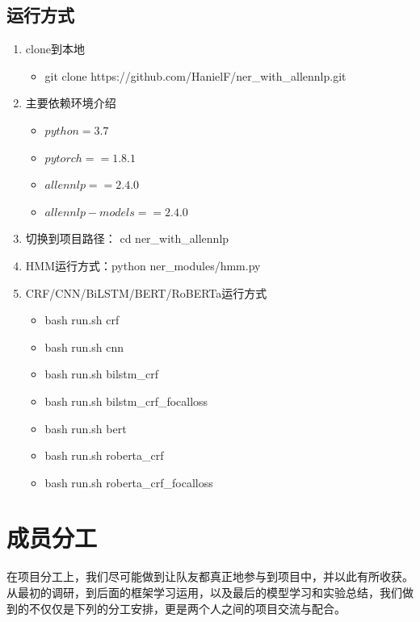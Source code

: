 \documentclass[a4paper, 12pt]{article}
\begin{document}
\subsection{运行方式}

\begin{enumerate}
    \item clone到本地
        \begin{itemize}
            \item git clone https://github.com/HanielF/ner\_with\_allennlp.git
        \end{itemize}
    \item 主要依赖环境介绍
        \begin{itemize}
            \item $python= 3.7$
            \item $pytorch== 1.8.1$
            \item $allennlp== 2.4.0$
            \item $allennlp-models==2.4.0$
        \end{itemize}
    \item 切换到项目路径： cd ner\_with\_allennlp
    \item HMM运行方式：python ner\_modules/hmm.py
    \item CRF/CNN/BiLSTM/BERT/RoBERTa运行方式
        \begin{itemize}
            \item bash run.sh crf
            \item bash run.sh cnn
            \item bash run.sh bilstm\_crf
            \item bash run.sh bilstm\_crf\_focalloss
            \item bash run.sh bert
            \item bash run.sh roberta\_crf
            \item bash run.sh roberta\_crf\_focalloss
        \end{itemize}
\end{enumerate}

\section{成员分工}

在项目分工上，我们尽可能做到让队友都真正地参与到项目中，并以此有所收获。从最初的调研，到后面的框架学习运用，以及最后的模型学习和实验总结，我们做到的不仅仅是下列的分工安排，更是两个人之间的项目交流与配合。
\end{document}
